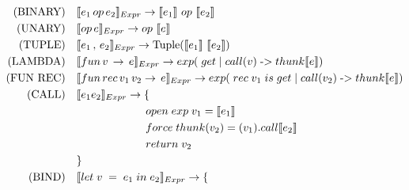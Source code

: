 \documentclass[12pt]{article}
\begin{document}
\begin{align*}
      \text{(BINARY)} \quad    & \translateNode{e_1 \, op \, e_2}{Expr} \rightarrow \translateResult{e_1} \, \, op \, \, \translateResult{e_2}                                                                  \\
      \text{(UNARY)} \quad     & \translateNode{op \, e}{Expr} \rightarrow op \, \, \translateResult{e}                                                                                                         \\
      \text{(TUPLE)} \quad     & \translateNode{e_1 \, , \, e_2}{Expr} \rightarrow \text{Tuple}(\translateResult{e_1} \, \, \translateResult{e_2})                                                              \\
      \text{(LAMBDA)} \quad    & \translateNode{fun \, v \, \rightarrow \, e}{Expr}    \rightarrow  exp(  \; get \; | \; call(v) \; \text{->}  \; thunk\translateResult{e}  )                                   \\
      \text{(FUN REC)} \quad   & \translateNode{fun \, rec \, v_1 \, v_2 \rightarrow \, e}{Expr}      \rightarrow exp( \; rec \; v_1 \; is \; get \; | \; call(v_2) \; \text{->}  \; thunk\translateResult{e} ) \\
      \text{(CALL)} \quad      & \translateNode{e_1 e_2}{Expr}     \rightarrow  \{                                                                                                                              \\
                               & \Tab open \; exp \; v_1  = \translateResult{e_1}                                                                                                                               \\
                               & \Tab force \; thunk(v_2) = (v_1).call\translateResult{e_2}                                                                                                                     \\
                               & \Tab return \; v_2                                                                                                                                                             \\
                               & \}                                                                                                                                                                             \\
      \text{(BIND)} \quad      & \translateNode{let \; v \; = \; e_1 \; in \; e_2}{Expr}  \rightarrow  \{                                                                                                       \\

\end{align*}
\end{document}
